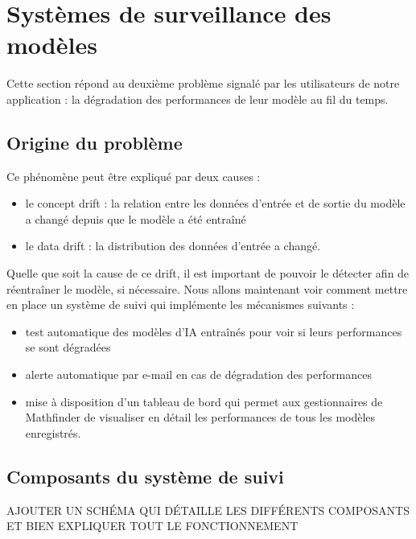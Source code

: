 \documentclass[french]{article}
\begin{document}
    \section{Systèmes de surveillance des modèles}
    Cette section répond au deuxième problème signalé par les utilisateurs de notre application : la dégradation des performances de leur modèle au fil du temps.
    \subsection{Origine du problème}
    Ce phénomène peut être expliqué par deux causes :
    \begin{itemize}
        \item le concept drift : la relation entre les données d'entrée et de sortie du modèle a changé depuis que le modèle a été entraîné
        \item le data drift : la distribution des données d'entrée a changé.
    \end{itemize}
    Quelle que soit la cause de ce drift, il est important de pouvoir le détecter afin de réentraîner le modèle, si nécessaire. Nous allons maintenant voir comment mettre en place un système de suivi qui implémente les mécanismes suivants :
    \begin{itemize}
        \item test automatique des modèles d'IA entraînés pour voir si leurs performances se sont dégradées
        \item alerte automatique par e-mail en cas de dégradation des performances
        \item mise à disposition d'un tableau de bord qui permet aux gestionnaires de Mathfinder de visualiser en détail les performances de tous les modèles enregistrés.
    \end{itemize} 
    \subsection{Composants du système de suivi}
    AJOUTER UN SCHÉMA QUI DÉTAILLE LES DIFFÉRENTS COMPOSANTS ET BIEN EXPLIQUER TOUT LE FONCTIONNEMENT
\end{document}

